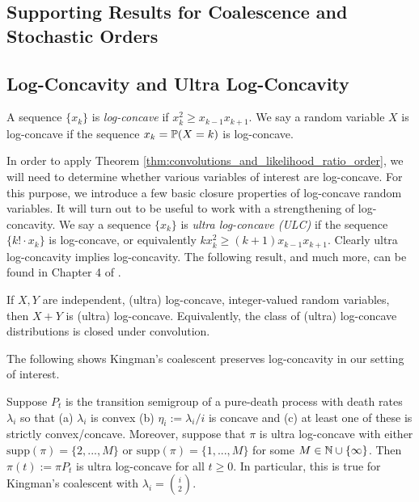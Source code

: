 \clearpage
\begin{subappendices}

\section{Supporting Results for Coalescence and Stochastic Orders}
\label{app:basic-results}

    \subsection{Log-Concavity and Ultra Log-Concavity}
    \label{app:basic-log-concavity}

    A sequence $\{x_k\}$ is \textit{log-concave} if $x_{k}^2 \geq x_{k-1}x_{k+1}$. We say a random variable $X$ is log-concave if the sequence $x_k = \P(X = k)$ is log-concave.

    In order to apply Theorem \ref{thm:convolutions_and_likelihood_ratio_order}, we will need to determine whether various variables of interest are log-concave. For this purpose, we introduce a few basic closure properties of log-concave random variables. It will turn out to be useful to work with a strengthening of log-concavity. We say a sequence $\{x_k\}$ is \textit{ultra log-concave (ULC)} if the sequence $\{k! \cdot x_k\}$ is log-concave, or equivalently $kx_k^2 \geq (k+1)x_{k-1}x_{k+1}$. Clearly ultra log-concavity implies log-concavity. The following result, and much more, can be found in Chapter 4 of \cite{saumard2014_log_concavity_strong_log_concavity_review}.

    \begin{theorem}[Pr\'ekopa]
\label{thm:prekopas_theorem}
        If $X, Y$ are independent, (ultra) log-concave, integer-valued random variables, then $X+Y$ is (ultra) log-concave. Equivalently, the class of (ultra) log-concave distributions is closed under convolution.
    \end{theorem}

    \noindent The following shows Kingman's coalescent preserves log-concavity in our setting of interest.

\begin{theorem}
\label{thm:kingman_preserves_ultralogconcave}
\noindent Suppose $P_t$ is the transition semigroup of a pure-death process with death rates $\lambda_i$ so that (a) $\lambda_i$ is convex (b) $\eta_i := \lambda_i/i$ is concave and (c) at least one of these is strictly convex/concave. Moreover, suppose that $\pi$ is ultra log-concave with either $\mathrm{supp}(\pi) = \{2,..., M\}$ or $\mathrm{supp}(\pi) = \{1,..., M\}$ for some $M \in \N \cup \{\infty\}$. Then $\pi(t) := \pi P_t$ is ultra log-concave for all $t \geq 0$. In particular, this is true for Kingman's coalescent with $\lambda_i = \binom{i}{2}$.
\end{theorem}


\end{subappendices}
